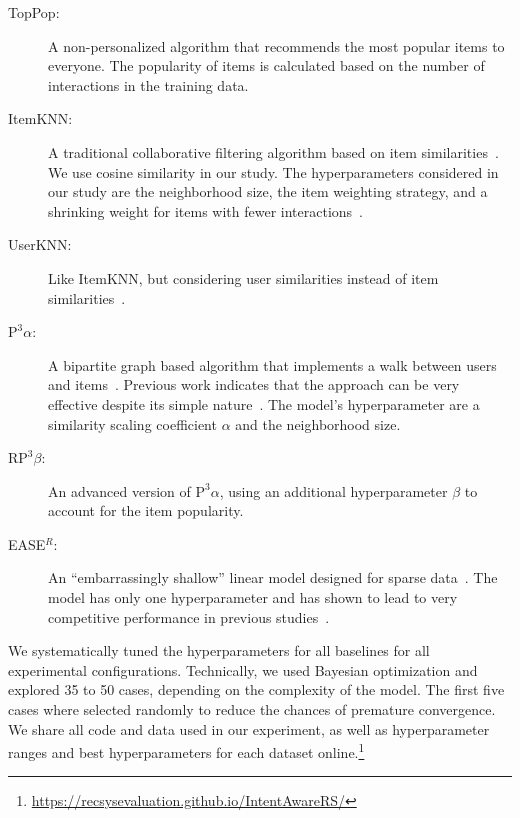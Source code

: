 \documentclass[sigconf,natbib=true,nonacm]{acmart}
\newcommand{\palpha}{\ensuremath{\text{P}^3\!\alpha}\xspace}
\newcommand{\pbeta}{\ensuremath{\text{RP}^3\!\beta}\xspace}
\newcommand{\easer}{EASE$^R$\xspace}
\begin{document}
\begin{description}
\item[TopPop:] A non-personalized algorithm that recommends the most popular items to everyone. The popularity of items is calculated based on the number of interactions in the training data.

\item[ItemKNN:]  A traditional collaborative filtering algorithm based on item similarities~\cite{wang2006unifying}. We use cosine similarity in our study. The hyperparameters considered in our study are the neighborhood size, the item weighting strategy, and a shrinking weight for items with fewer interactions~\cite{wang2008probabilistic,bell2007improved}.

\item[UserKNN:]  Like ItemKNN, but considering user similarities instead of item similarities~\cite{Resnick:1994:GOA:192844.192905}.

\item[\palpha:]  A bipartite graph based algorithm that implements a walk between users and items~\cite{cooper2014P3alpha}. Previous work indicates that the approach can be very effective despite its simple nature~\cite{ferraridacremaetal2019}.  The model's hyperparameter are a similarity scaling coefficient $\alpha$ and the neighborhood size.

\item[\pbeta:]  An advanced version of \palpha, using an additional hyperparameter $\beta$ to account for the item popularity.

\item[\easer:]   An ``embarrassingly shallow'' linear model designed for sparse data~\cite{steck2019embarrassingly}. The model has only one hyperparameter and has shown to lead to very competitive performance in previous studies~\cite{anellitop2022,ferraridacrema2020tois}.


\end{description}

We systematically tuned the hyperparameters for all baselines for all experimental configurations. Technically, we used Bayesian optimization and explored 35 to 50 cases, depending on the complexity of the model. The first five cases where selected randomly to reduce the chances of premature convergence. We share all code and data used in our experiment, as well as hyperparameter ranges and best hyperparameters for each dataset online.\footnote{\href {https://recsysevaluation.github.io/IntentAwareRS/}{https://recsysevaluation.github.io/IntentAwareRS/}}
\end{document}

